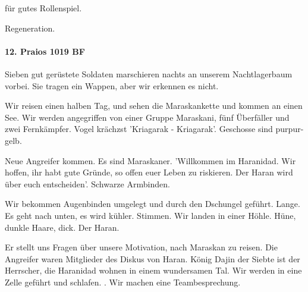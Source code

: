  für gutes Rollenspiel.

 Regeneration.

\paragraph{12. Praios 1019 BF}
Sieben gut gerüstete Soldaten marschieren nachts an unserem Nachtlagerbaum vorbei. Sie tragen ein Wappen, aber wir erkennen es nicht.

Wir reisen einen halben Tag, und sehen die Maraskankette und kommen an einen See. Wir werden angegriffen von einer Gruppe Maraskani, fünf Überfäller und zwei Fernkämpfer. Vogel krächzst 'Kriagarak - Kriagarak'. Geschosse sind purpur-gelb.

Neue Angreifer kommen. Es sind Maraskaner. 'Willkommen im Haranidad. Wir hoffen, ihr habt gute Gründe, so offen euer Leben zu riskieren. Der Haran wird über euch entscheiden'. Schwarze Armbinden.

Wir bekommen Augenbinden umgelegt und durch den Dschungel geführt. Lange. Es geht nach unten, es wird kühler. Stimmen. Wir landen in einer Höhle. Hüne, dunkle Haare, dick. Der Haran.

Er stellt uns Fragen über unsere Motivation, nach Maraskan zu reisen. Die Angreifer waren Mitglieder des Diskus von Haran.
König Dajin der Siebte ist der Herrscher, die Haranidad wohnen in einem wundersamen Tal. 
Wir werden in eine Zelle geführt und schlafen. . Wir machen eine Teambesprechung. 

